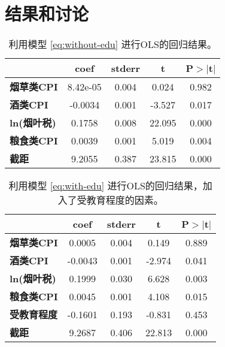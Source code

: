 \documentclass[10pt,a4paper,twocolumn]{PPRAcn} %
\begin{document}
\section{结果和讨论}
\begin{table}
	\begin{center}
		\begin{tabular}{lcccc}
			\toprule
			& \textbf{coef} & \textbf{stderr} & \textbf{t} & \textbf{P$> |$t$|$} \\
			\midrule
			\textbf{烟草类CPI}           &     8.42e-05  &        0.004     &     0.024  &         0.982        \\
			\textbf{酒类CPI}           &      -0.0034  &        0.001     &    -3.527  &         0.017        \\
			\textbf{ln(烟叶税)} &       0.1758  &        0.008     &    22.095  &         0.000        \\
			\textbf{粮食类CPI}        &       0.0039  &        0.001     &     5.019  &         0.004        \\
			\textbf{截距}         &       9.2055  &        0.387     &    23.815  &         0.000        \\
			\bottomrule
		\end{tabular}
	\end{center}
\caption{利用模型 \eqref{eq:without-edu} 进行OLS的回归结果。}
\label{tab:without-edu}
\end{table}

\begin{table}
	\begin{center}
		\begin{tabular}{lcccc}
			\toprule
			& \textbf{coef} & \textbf{stderr} & \textbf{t} & \textbf{P$> |$t$|$} \\
			\midrule
			\textbf{烟草类CPI}           &       0.0005  &        0.004     &     0.149  &         0.889        \\
			\textbf{酒类CPI}           &      -0.0043  &        0.001     &    -2.974  &         0.041        \\
			\textbf{ln(烟叶税)} &       0.1999  &        0.030     &     6.628  &         0.003        \\
			\textbf{粮食类CPI}         &       0.0045  &        0.001     &     4.108  &         0.015         \\
			\textbf{受教育程度}              &      -0.1601  &        0.193     &    -0.831  &         0.453       \\
			\textbf{截距}        &       9.2687  &        0.406     &    22.813  &         0.000        \\
			\bottomrule
		\end{tabular}
	\end{center}
	\caption{利用模型 \eqref{eq:with-edu} 进行OLS的回归结果，加入了受教育程度的因素。}
	\label{tab:with-edu}
\end{table}
\end{document}
